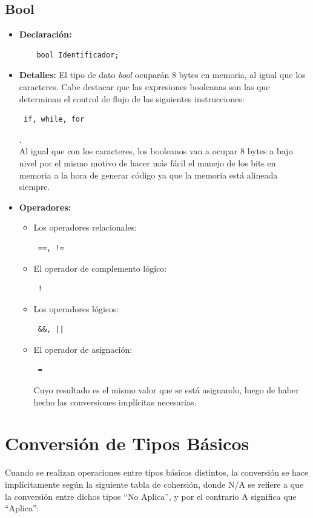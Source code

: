 \documentclass[11pt, spanish]{report}
\begin{document}
\subsection{Bool}
\begin{itemize}
\item \textbf{Declaraci\'on:}
  \begin{verbatim}
    bool Identificador;
  \end{verbatim}
\item \textbf{Detalles:}
  El tipo de dato \emph{bool} ocupar\'an 8 bytes en memoria, al igual que los caracteres. Cabe destacar que las expresiones booleanas son las que
  determinan el control de flujo de las siguientes instrucciones: \begin{verbatim} if, while, for \end{verbatim}.\\

  Al igual que con los caracteres, los booleanos van a ocupar 8 bytes a bajo nivel por el mismo motivo de hacer m\'as f\'acil el manejo de los bits
  en memoria a la hora de generar c\'odigo ya que la memoria est\'a alineada siempre.\\

\item \textbf{Operadores:}
  \begin{itemize}
  \item Los operadores relacionales: \begin{verbatim} ==, != \end{verbatim}
  \item El operador de complemento l\'ogico: \begin{verbatim} ! \end{verbatim}
  \item Los operadores l\'ogicos: \begin{verbatim} &&, || \end{verbatim}
  \item El operador de asignaci\'on:
    \begin{verbatim} = \end{verbatim}
    Cuyo resultado es el mismo valor que se est\'a asignando, luego de haber hecho las conversiones impl\'icitas necesarias.
  \end{itemize}
\end{itemize}

\section{Conversi\'on de Tipos B\'asicos}
Cuando se realizan operaciones entre tipos b\'asicos distintos, la conversi\'on se hace impl\'icitamente seg\'un la siguiente tabla de cohersi\'on, donde N/A se refiere a que la conversi\'on entre dichos tipos ``No Aplica'', y por el contrario A significa que ``Aplica'':\\
\end{document}
